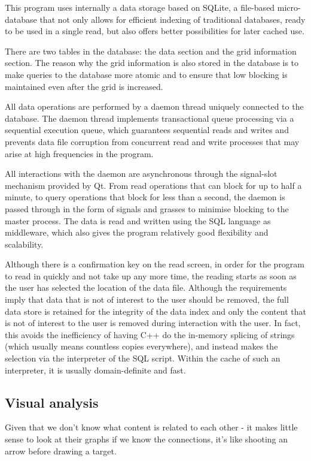 \documentclass[
]{article}
\begin{document}
This program uses internally a data storage based on SQLite, a
file-based micro-database that not only allows for efficient indexing of
traditional databases, ready to be used in a single read, but also
offers better possibilities for later cached use.

There are two tables in the database: the data section and the grid
information section. The reason why the grid information is also stored
in the database is to make queries to the database more atomic and to
ensure that low blocking is maintained even after the grid is increased.

All data operations are performed by a daemon thread uniquely connected
to the database. The daemon thread implements transactional queue
processing via a sequential execution queue, which guarantees sequential
reads and writes and prevents data file corruption from concurrent read
and write processes that may arise at high frequencies in the program.

All interactions with the daemon are asynchronous through the
signal-slot mechanism provided by Qt. From read operations that can
block for up to half a minute, to query operations that block for less
than a second, the daemon is passed through in the form of signals and
grasses to minimise blocking to the master process. The data is read and
written using the SQL language as middleware, which also gives the
program relatively good flexibility and scalability.

Although there is a confirmation key on the read screen, in order for
the program to read in quickly and not take up any more time, the
reading starts as soon as the user has selected the location of the data
file. Although the requirements imply that data that is not of interest
to the user should be removed, the full data store is retained for the
integrity of the data index and only the content that is not of interest
to the user is removed during interaction with the user. In fact, this
avoids the inefficiency of having C++ do the in-memory splicing of
strings (which usually means countless copies everywhere), and instead
makes the selection via the interpreter of the SQL script. Within the
cache of such an interpreter, it is usually domain-definite and fast.

\subsection{Visual analysis}

Given that we don't know what content is related to each other - it
makes little sense to look at their graphs if we know the connections,
it's like shooting an arrow before drawing a target.
\end{document}
